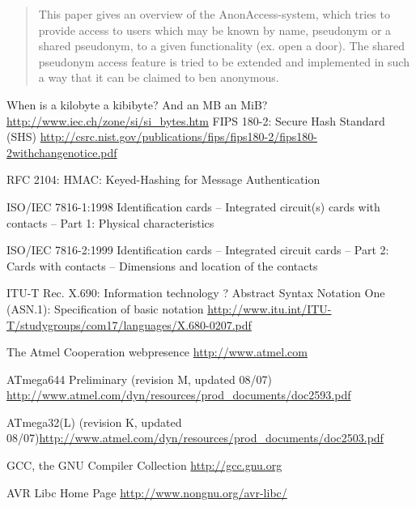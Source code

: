 \documentclass[10pt,a4paper]{article}
\begin{document}
\maketitle


\begin{abstract}
This paper gives an overview of the AnonAccess-system, which tries to provide access to users which may be known by name, pseudonym or a shared pseudonym, to a given functionality (ex. open a door). The shared pseudonym access feature is tried to be extended and implemented in such a way that it can be claimed to ben anonymous.
\end{abstract}







\begin{appendix}


\end{appendix}
 
\newpage

\begin{thebibliography}{999}
 When is a kilobyte a kibibyte? And an MB an MiB?\url{http://www.iec.ch/zone/si/si_bytes.htm}
 FIPS 180-2: Secure Hash Standard (SHS) \url{http://csrc.nist.gov/publications/fips/fips180-2/fips180-2withchangenotice.pdf}
 
 RFC 2104: HMAC: Keyed-Hashing for Message Authentication

 ISO/IEC 7816-1:1998 Identification cards -- Integrated circuit(s) cards with contacts -- Part 1: Physical characteristics

 ISO/IEC 7816-2:1999 Identification cards -- Integrated circuit cards -- Part 2: Cards with contacts -- Dimensions and location of the contacts

 ITU-T Rec. X.690: Information technology ? Abstract Syntax Notation One (ASN.1): Specification of basic notation \url{http://www.itu.int/ITU-T/studygroups/com17/languages/X.680-0207.pdf}

 The Atmel Cooperation webpresence \url{http://www.atmel.com}  

 ATmega644 Preliminary (revision M, updated 08/07) \url{http://www.atmel.com/dyn/resources/prod_documents/doc2593.pdf}

 ATmega32(L) (revision K, updated 08/07)\url{http://www.atmel.com/dyn/resources/prod_documents/doc2503.pdf}

 GCC, the GNU Compiler Collection \url{http://gcc.gnu.org}
 
 AVR Libc Home Page \url{http://www.nongnu.org/avr-libc/}
\end{thebibliography}
\end{document}
